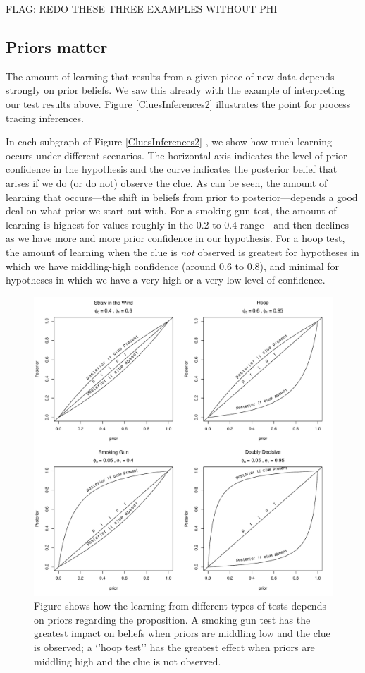 \documentclass[
  12pt,
]{book}
\begin{document}
FLAG: REDO THESE THREE EXAMPLES WITHOUT PHI

\hypertarget{AppPriors}{%
\subsection{Priors matter}\label{AppPriors}}

The amount of learning that results from a given piece of new data depends strongly on prior beliefs. We saw this already with the example of interpreting our test results above. Figure \ref{CluesInferences2} illustrates the point for process tracing inferences.

In each subgraph of Figure \ref{CluesInferences2} , we show how much learning occurs under different scenarios. The horizontal axis indicates the level of prior confidence in the hypothesis and the curve indicates the posterior belief that arises if we do (or do not) observe the clue. As can be seen, the amount of learning that occurs---the shift in beliefs from prior to posterior---depends a good deal on what prior we start out with. For a smoking gun test, the amount of learning is highest for values roughly in the 0.2 to 0.4 range---and then declines as we have more and more prior confidence in our hypothesis. For a hoop test, the amount of learning when the clue is \emph{not} observed is greatest for hypotheses in which we have middling-high confidence (around 0.6 to 0.8), and minimal for hypotheses in which we have a very high or a very low level of confidence.

\begin{figure}
\centering
\includegraphics{ii_files/figure-latex/CluesInferences2-1.pdf}
\caption{\label{fig:CluesInferences2}Figure shows how the learning from different types of tests depends on priors regarding the proposition. A smoking gun test has the greatest impact on beliefs when priors are middling low and the clue is observed; a `'hoop test'' has the greatest effect when priors are middling high and the clue is not observed.}
\end{figure}
\end{document}
